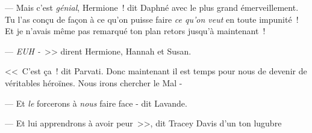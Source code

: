 --- Mais c'est \emph{génial}, Hermione~! dit Daphné avec le plus grand émerveillement. Tu l'as conçu de façon à ce qu'on puisse faire \emph{ce qu'on veut} en toute impunité~! Et je n'avais même pas remarqué ton plan retors jusqu'à maintenant~!

--- \emph{EUH -}~>> dirent Hermione, Hannah et Susan.

<<~C'est ça~! dit Parvati. Donc maintenant il est temps pour nous de devenir de véritables héroïnes. Nous irons chercher le Mal -

--- Et \emph{le} forcerons à \emph{nous} faire face - dit Lavande.

--- Et lui apprendrons à avoir peur~>>, dit Tracey Davis d'un ton lugubre
